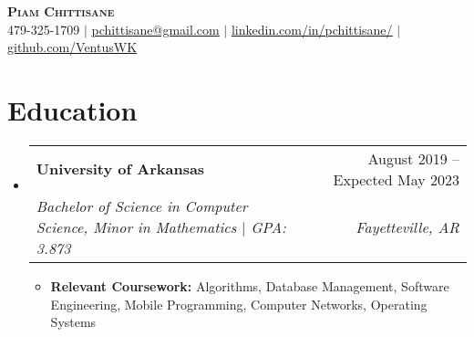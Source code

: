 \documentclass[letterpaper,11pt]{article}
\makeatletter
\newcommand{\resumeItem}[1]{
  \item\small{
    {#1 \vspace{-2pt}}
  }
}
\newcommand{\resumeSubheading}[4]{
  \vspace{-2pt}\item
    \begin{tabular*}{0.97\textwidth}[t]{l@{\extracolsep{\fill}}r}
      \textbf{#1} & #2 \\
      \textit{\small#3} & \textit{\small #4} \\
    \end{tabular*}\vspace{-7pt}
}
\newcommand{\resumeSubSubheading}[2]{
    \item
    \begin{tabular*}{0.97\textwidth}{l@{\extracolsep{\fill}}r}
      \textit{\small#1} & \textit{\small #2} \\
    \end{tabular*}\vspace{-7pt}
}
\newcommand{\resumeSubHeadingListStart}{\begin{itemize}[leftmargin=0.15in, label={}]}
\newcommand{\resumeSubHeadingListEnd}{\end{itemize}}
\newcommand{\resumeItemListStart}{\begin{itemize}}
\newcommand{\resumeItemListEnd}{\end{itemize}\vspace{-5pt}}
\makeatother
\begin{document}

\begin{center}
    \textbf{\Huge \scshape Piam Chittisane} \\ \vspace{1pt}
    \small 479-325-1709 $|$ \href{mailto:pchittisane@gmail.com}{\underline{pchittisane@gmail.com}} $|$ 
    \href{https://linkedin.com/in/pchittisane}{\underline{linkedin.com/in/pchittisane/}} $|$
    \href{https://github.com/VentusWK}{\underline{github.com/VentusWK}}
\end{center}


\section{Education}
  \resumeSubHeadingListStart
    \resumeSubheading
      {University of Arkansas}{August 2019 -- Expected May 2023}
      {Bachelor of Science in Computer Science, Minor in Mathematics $\mid$ GPA: 3.873}{Fayetteville, AR}
      \resumeItemListStart
        \resumeItem{\textbf{Relevant Coursework:}{ Algorithms, Database Management, Software Engineering, Mobile Programming, Computer Networks, Operating Systems} }
      \resumeItemListEnd
  \resumeSubHeadingListEnd
  



      
\end{document}
